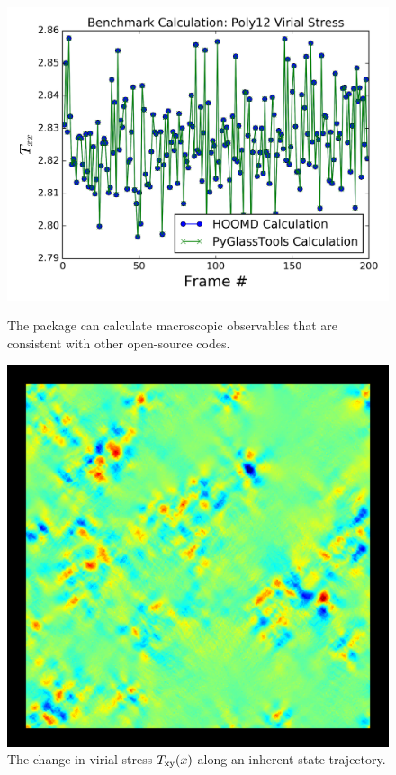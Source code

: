 \begin{frame}[c]
\begin{columns}[c]
\begin{column}{0.5\textwidth}
\begin{figure}
\begin{overprint}
\centering\includegraphics[width=\linewidth]{backup-simulationdetails/benchmarkthermo.png}
    \caption{The package can calculate macroscopic observables that are consistent with other open-source codes.}
\centering\includegraphics[height=0.7\textheight]{backup-simulationdetails/stresstraj.png}\caption{The change in virial stress $T_\mathrm{xy}(\* x)$ along an inherent-state trajectory.}

\end{overprint}
\end{figure}
\end{column}
\end{columns}
\end{frame}
